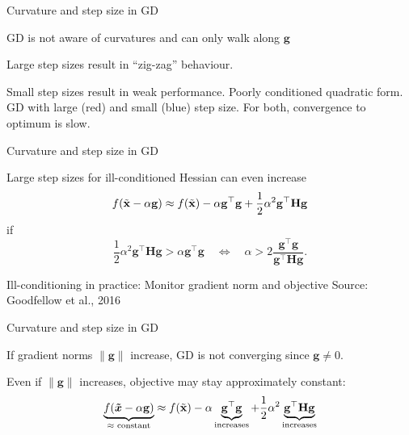 \documentclass[11pt,compress,t,notes=noshow, xcolor=table]{beamer}
\begin{document}
\begin{framei}{Curvature and step size in GD}
\item GD is not aware of curvatures and can only walk along $\mathbf{g}$
\item Large step sizes result in ``zig-zag'' behaviour.
\item Small step sizes result in weak performance.
\centering\footnotesize Poorly conditioned quadratic form. GD with large (red) and small (blue) step size. For both, convergence to optimum is slow.
\end{framei}

\begin{framei}{Curvature and step size in GD}
\item Large step sizes for ill-conditioned Hessian can even increase
$$f(\tilde{\mathbf{x}} - \alpha \mathbf{g}) \approx f(\tilde{\mathbf{x}}) - \alpha \mathbf{g}^\top \mathbf{g} + \frac{1}{2} \alpha^2 \mathbf{g}^\top \mathbf{H} \mathbf{g}$$
if $$\frac{1}{2} \alpha^2 \mathbf{g}^\top \mathbf{H} \mathbf{g} > \alpha \mathbf{g}^\top\mathbf{g} \quad \Leftrightarrow \quad \alpha > 2\frac{\mathbf{g}^\top \mathbf{g}}{\mathbf{g}^\top \mathbf{H} \mathbf{g}}.$$
\item Ill-conditioning in practice: Monitor gradient norm and objective
\centering \footnotesize Source: Goodfellow et al., 2016
\end{framei}

\begin{framei}{Curvature and step size in GD}
\item If gradient norms $\|\mathbf{g}\|$ increase, GD is not converging since $\mathbf{g} \not= 0$.
\item Even if $\|\mathbf{g}\|$ increases, objective may stay approximately constant:
$$\underbrace{f(\bm{\tilde{x}}-\alpha \mathbf{g})}_{\text{$\approx$ constant}} \approx f(\tilde{\mathbf{x}}) - \alpha \underbrace{\mathbf{g}^\top \mathbf{g}}_{\text{increases}} + \frac{1}{2} \alpha^2 \underbrace{\mathbf{g}^\top \mathbf{H} \mathbf{g}}_{\text{increases}}$$
\end{framei}

\endlecture
\end{document}
